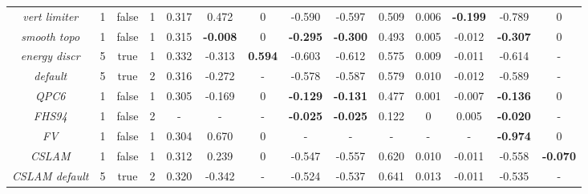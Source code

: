 \documentclass[draft,linenumbers]{agujournal}
\begin{document}
\begin{table}
\begin{tabular}{c|ccc|ccc|cccccc|c}
{\em{vert limiter}} & 1 & false & 1 &  0.317&  0.472& 0    & -0.590& -0.597&  0.509& 0.006          & {\bf{-0.199}} & -0.789 &  0\\
%
%
%
%
{\em{smooth topo}} & 1 & false & 1  &  0.315& {\bf{-0.008}}& 0  & {\bf{-0.295}}& {\bf{-0.300}}  &  0.493& 0.005          & -0.012& {\bf{-0.307}} & 0\\
{\em{energy discr}} & 5 & true  & 1 &  0.332& -0.313& {\bf{0.594}}& -0.603& -0.612&  0.575& 0.009          & -0.011& -0.614 & -\\
{\em{default}}      & 5 & true  & 2 &  0.316& -0.272&      -      & -0.578& -0.587&  0.579& 0.010          & -0.012& -0.589 & -\\ %
\hline
{\em{QPC6}}         & 1 & false & 1 &  0.305& -0.169& 0    &{\bf{-0.129}}& {\bf{-0.131}}&  0.477& 0.001 & -0.007& {\bf{-0.136}} & 0\\
{\em{FHS94}}        & 1 & false & 2 &  -    &   -   &  -   & {\bf{-0.025}}&{\bf{-0.025}} &  0.122& 0 &  0.005 & {\bf{-0.020}} & -\\
{\em{FV}}       & 1 & false & 1 &  0.304&  0.670& 0    & - & - & - & - & - & {\bf{-0.974}} & 0 \\
{\em{CSLAM}} & 1 & false & 1 &  0.312& 0.239& 0 & -0.547& -0.557&   0.620&   0.010& -0.011& -0.558& {\bf{-0.070}}\\
{\em{CSLAM default}} & 5 & true   & 2   &   0.320& -0.342&  - & -0.524& -0.537&  0.641& 0.013& -0.011& -0.535& - 
  \end{tabular}
  \end{table}
\end{document}
